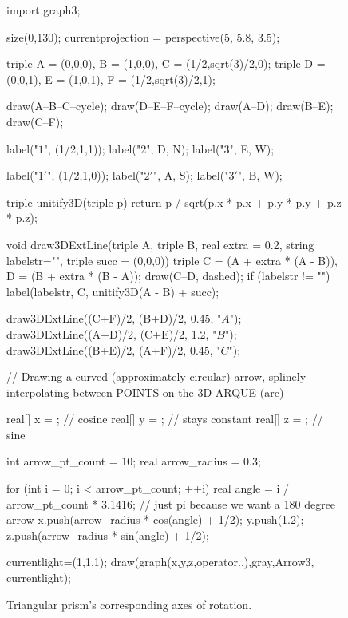 \documentclass[../gatm.tex]{subfiles}
\begin{document}
\begin{figure}
	\begin{center}
		\begin{minipage}[b]{\textwidth}
			\centering
			\begin{asy}[width=0.5\textwidth]
				import graph3;
				
				size(0,130);
				currentprojection = perspective(5, 5.8, 3.5);
				
				triple A = (0,0,0), B = (1,0,0), C = (1/2,sqrt(3)/2,0);
				triple D = (0,0,1), E = (1,0,1), F = (1/2,sqrt(3)/2,1);
				
				draw(A--B--C--cycle);
				draw(D--E--F--cycle);
				draw(A--D);
				draw(B--E);
				draw(C--F);
				
				label("$1$", (1/2,1,1));
				label("$2$", D, N);
				label("$3$", E, W);
				
				label("$1'$", (1/2,1,0));
				label("$2'$", A, S);
				label("$3'$", B, W);
				
				triple unitify3D(triple p) {
					return p / sqrt(p.x * p.x + p.y * p.y + p.z * p.z);
				}
				
				void draw3DExtLine(triple A, triple B, real extra = 0.2, string labelstr="", triple succ = (0,0,0)) {
					triple C = (A + extra * (A - B)), D = (B + extra * (B - A));
					draw(C--D, dashed);
					if (labelstr != "") label(labelstr, C, unitify3D(A - B) + succ);
				}
				
				draw3DExtLine((C+F)/2, (B+D)/2, 0.45, "$A$");
				draw3DExtLine((A+D)/2, (C+E)/2, 1.2, "$B$");
				draw3DExtLine((B+E)/2, (A+F)/2, 0.45, "$C$");
				
				// Drawing a curved (approximately circular) arrow, splinely interpolating between POINTS on the 3D ARQUE (arc)
				
				real[] x = {}; // cosine
				real[] y = {}; // stays constant
				real[] z = {}; // sine
				
				int arrow_pt_count = 10;
				real arrow_radius = 0.3;
				
				for (int i = 0; i < arrow_pt_count; ++i) {
					real angle = i / arrow_pt_count * 3.1416; // just pi because we want a 180 degree arrow
					x.push(arrow_radius * cos(angle) + 1/2);
					y.push(1.2);
					z.push(arrow_radius * sin(angle) + 1/2);
				}
				
				currentlight=(1,1,1);
				draw(graph(x,y,z,operator..),gray,Arrow3, currentlight);
			\end{asy}
		\end{minipage}
	\end{center}
	\vspace*{-2\baselineskip}
	\begin{center}
		\begin{minipage}[t]{\textwidth}
			\caption{Triangular prism's corresponding axes of rotation.}
			\label{fig:tri_prism_rot}
		\end{minipage}
	\end{center}
\end{figure}
\end{document}
